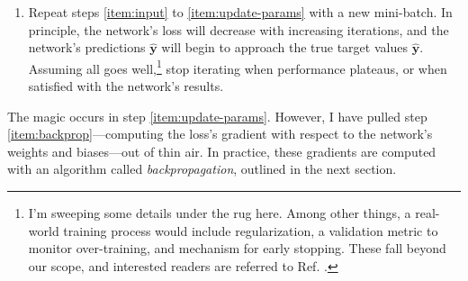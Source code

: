 \documentclass[11pt, a4paper]{article}
\renewcommand{\vec}[1]{\bm{#1}}
\newcommand{\y}{\vec{y}}
\begin{document}
\begin{enumerate}
    \item Repeat steps \ref{item:input} to \ref{item:update-params} with a new mini-batch.
    In principle, the network's loss will decrease with increasing iterations, and the network's predictions $ \hat{\y} $ will begin to approach the true target values $ \hat{\y} $.
    Assuming all goes well,\footnote{I'm sweeping some details under the rug here.
    Among other things, a real-world training process would include regularization, a validation metric to monitor over-training, and mechanism for early stopping.
    These fall beyond our scope, and interested readers are referred to Ref. \cite{homl}.} stop iterating when performance plateaus, or when satisfied with the network's results.

\end{enumerate}
The magic occurs in step \ref{item:update-params}.
However, I have pulled step \ref{item:backprop}---computing the loss's gradient with respect to the network's weights and biases---out of thin air.
In practice, these gradients are computed with an algorithm called \textit{backpropagation}, outlined in the next section.
\end{document}

